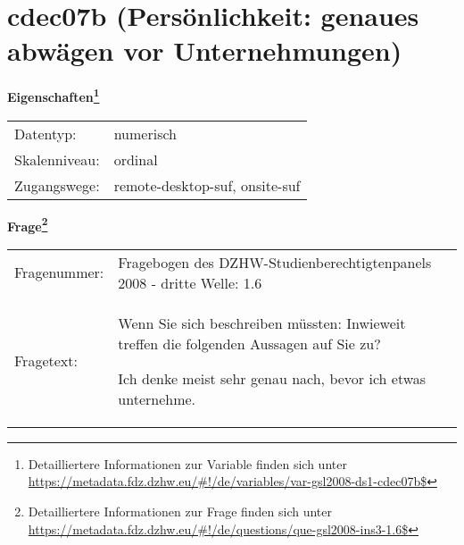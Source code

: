 
    \setcounter{footnote}{0}

    \vspace*{-1.8cm}
	\section{cdec07b (Persönlichkeit: genaues abwägen vor Unternehmungen)}
	\label{section:cdec07b}



    \vspace*{0.5cm}
    \noindent\textbf{Eigenschaften\footnote{Detailliertere Informationen zur Variable finden sich unter
		\url{https://metadata.fdz.dzhw.eu/\#!/de/variables/var-gsl2008-ds1-cdec07b$}}}\\
	\begin{tabularx}{\hsize}{@{}lX}
	Datentyp: & numerisch \\
	Skalenniveau: & ordinal \\
	Zugangswege: &
	  remote-desktop-suf, 
	  onsite-suf
 \\
    \end{tabularx}



				\vspace*{0.5cm}
                \noindent\textbf{Frage\footnote{Detailliertere Informationen zur Frage finden sich unter
		              \url{https://metadata.fdz.dzhw.eu/\#!/de/questions/que-gsl2008-ins3-1.6$}}}\\
				\begin{tabularx}{\hsize}{@{}lX}
					Fragenummer: &
					  Fragebogen des DZHW-Studienberechtigtenpanels 2008 - dritte Welle:
					  1.6
 \\
					Fragetext: & Wenn Sie sich beschreiben müssten: Inwieweit treffen die folgenden Aussagen auf Sie zu?\par  Ich denke meist sehr genau nach, bevor ich etwas unternehme. \\
				\end{tabularx}






